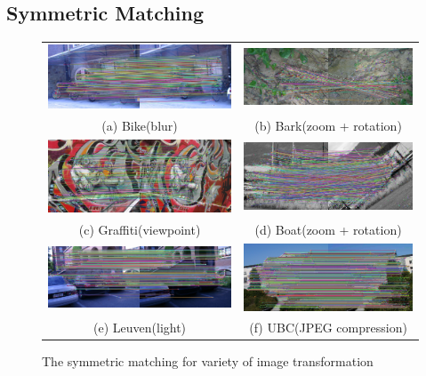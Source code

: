 \subsection {Symmetric Matching}
\begin{figure}[H]
\begin{tabular}{cc}
  \includegraphics[width=75mm]{figures/bike_sym_1_3} &  \includegraphics[width=75mm]{figures/barks_sym_1_3} \\
(a) Bike(blur) & (b) Bark(zoom + rotation) \\[6pt]
 \includegraphics[width=75mm]{figures/graffiti_sym_1_3} &  \includegraphics[width=75mm]{figures/boat_sym_1_3} \\
(c) Graffiti(viewpoint) & (d) Boat(zoom + rotation) \\[6pt]
 \includegraphics[width=75mm]{figures/leuven_sym_1_3} &  \includegraphics[width=75mm]{figures/ubc_sym_1_3} \\
(e) Leuven(light) & (f) UBC(JPEG compression) \\[6pt]
\end{tabular}
\caption{The symmetric matching for variety of image transformation}\label{fig:symmetric_matching}
\end{figure}

